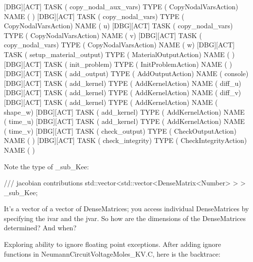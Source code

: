 {[DBG][ACT] TASK (     copy_nodal_aux_vars) TYPE (             CopyNodalVarsAction) NAME (                )
[DBG][ACT] TASK (         copy_nodal_vars) TYPE (             CopyNodalVarsAction) NAME (               u)
[DBG][ACT] TASK (         copy_nodal_vars) TYPE (             CopyNodalVarsAction) NAME (               v)
[DBG][ACT] TASK (         copy_nodal_vars) TYPE (             CopyNodalVarsAction) NAME (               w)
[DBG][ACT] TASK (   setup_material_output) TYPE (            MaterialOutputAction) NAME (                )
[DBG][ACT] TASK (            init_problem) TYPE (               InitProblemAction) NAME (                )
[DBG][ACT] TASK (              add_output) TYPE (                 AddOutputAction) NAME (         console)
[DBG][ACT] TASK (              add_kernel) TYPE (                 AddKernelAction) NAME (          diff_u)
[DBG][ACT] TASK (              add_kernel) TYPE (                 AddKernelAction) NAME (          diff_v)
[DBG][ACT] TASK (              add_kernel) TYPE (                 AddKernelAction) NAME (         shape_w)
[DBG][ACT] TASK (              add_kernel) TYPE (                 AddKernelAction) NAME (          time_u)
[DBG][ACT] TASK (              add_kernel) TYPE (                 AddKernelAction) NAME (          time_v)
[DBG][ACT] TASK (            check_output) TYPE (               CheckOutputAction) NAME (                )
[DBG][ACT] TASK (         check_integrity) TYPE (            CheckIntegrityAction) NAME (                )

Note the type of _sub_Kee:

  /// jacobian contributions
  std::vector<std::vector<DenseMatrix<Number> > > _sub_Kee;

  It's a vector of a vector of DenseMatrices; you access individual DenseMatrices by specifying the ivar and the jvar. So how are the dimensions of the DenseMatrices determined? And when?

  Exploring ability to ignore floating point exceptions. After adding ignore functions in NeumannCircuitVoltageMoles_KV.C, here is the backtrace:

}

